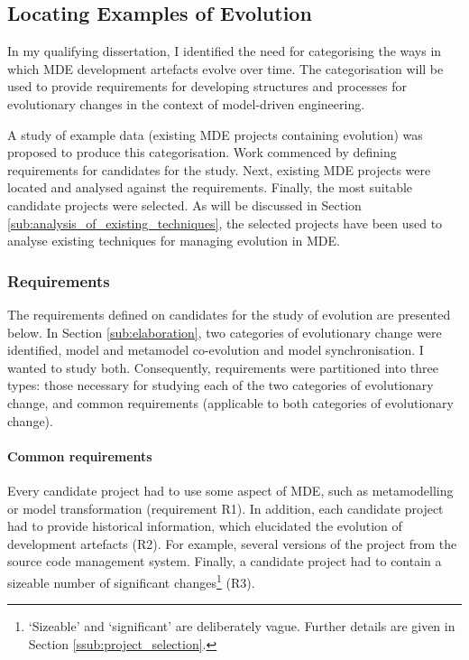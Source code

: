 \subsection{Locating Examples of Evolution}
In my qualifying dissertation, I identified the need for categorising the ways in which MDE development artefacts evolve over time. The categorisation will be used to provide requirements for developing structures and processes for evolutionary changes in the context of model-driven engineering.

A study of example data (existing MDE projects containing evolution) was proposed to produce this categorisation. Work commenced by defining requirements for candidates for the study. Next, existing MDE projects were located and analysed against the requirements. Finally, the most suitable candidate projects were selected. As will be discussed in Section \ref{sub:analysis_of_existing_techniques}, the selected projects have been used to analyse existing techniques for managing evolution in MDE.

\subsubsection{Requirements} %
\label{ssub:requirements}
The requirements defined on candidates for the study of evolution are presented below. In Section \ref{sub:elaboration}, two categories of evolutionary change were identified, model and metamodel co-evolution and model synchronisation. I wanted to study both. Consequently, requirements were partitioned into three types: those necessary for studying each of the two categories of evolutionary change, and common requirements (applicable to both categories of evolutionary change).

\paragraph{Common requirements}
Every candidate project had to use some aspect of MDE, such as metamodelling or model transformation (requirement R1). In addition, each candidate project had to provide historical information, which elucidated the evolution of development artefacts (R2). For example, several versions of the project from the source code management system. Finally, a candidate project had to contain a sizeable number of significant changes\footnote{`Sizeable' and `significant' are deliberately vague. Further details are given in Section \ref{ssub:project_selection}.} (R3).

